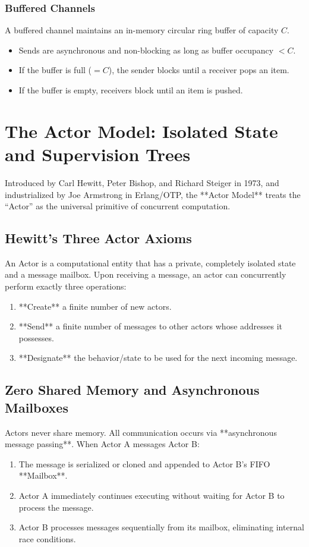 \subsubsection{Buffered Channels}
A buffered channel maintains an in-memory circular ring buffer of capacity $C$.
\begin{itemize}[leftmargin=15pt]
  \item Sends are asynchronous and non-blocking as long as buffer occupancy $< C$.
  \item If the buffer is full ($= C$), the sender blocks until a receiver pops an item.
  \item If the buffer is empty, receivers block until an item is pushed.
\end{itemize}

\section{The Actor Model: Isolated State and Supervision Trees}

Introduced by Carl Hewitt, Peter Bishop, and Richard Steiger in 1973, and industrialized by Joe Armstrong in Erlang/OTP, the **Actor Model** treats the ``Actor'' as the universal primitive of concurrent computation.

\subsection{Hewitt's Three Actor Axioms}

An Actor is a computational entity that has a private, completely isolated state and a message mailbox. Upon receiving a message, an actor can concurrently perform exactly three operations:
\begin{enumerate}[leftmargin=15pt]
  \item **Create** a finite number of new actors.
  \item **Send** a finite number of messages to other actors whose addresses it possesses.
  \item **Designate** the behavior/state to be used for the next incoming message.
\end{enumerate}

\subsection{Zero Shared Memory and Asynchronous Mailboxes}

Actors never share memory. All communication occurs via **asynchronous message passing**. When Actor A messages Actor B:
\begin{enumerate}[leftmargin=15pt]
  \item The message is serialized or cloned and appended to Actor B's FIFO **Mailbox**.
  \item Actor A immediately continues executing without waiting for Actor B to process the message.
  \item Actor B processes messages sequentially from its mailbox, eliminating internal race conditions.
\end{enumerate}


